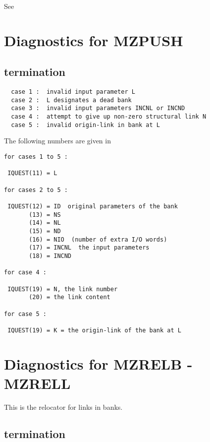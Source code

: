 
See 

\section{Diagnostics for MZPUSH}


\subsection*{ termination}

\begin{verbatim}
  case 1 :  invalid input parameter L
  case 2 :  L designates a dead bank
  case 3 :  invalid input parameters INCNL or INCND
  case 4 :  attempt to give up non-zero structural link N
  case 5 :  invalid origin-link in bank at L
\end{verbatim}

The following numbers are given in 

\begin{verbatim}
for cases 1 to 5 :

 IQUEST(11) = L

for cases 2 to 5 :

 IQUEST(12) = ID  original parameters of the bank
       (13) = NS
       (14) = NL
       (15) = ND
       (16) = NIO  (number of extra I/O words)
       (17) = INCNL  the input parameters
       (18) = INCND

for case 4 :

 IQUEST(19) = N, the link number
       (20) = the link content

for case 5 :

 IQUEST(19) = K = the origin-link of the bank at L
\end{verbatim}

\section{Diagnostics for MZRELB - MZRELL}


This is the relocator for links in banks.

\subsection*{ termination}

